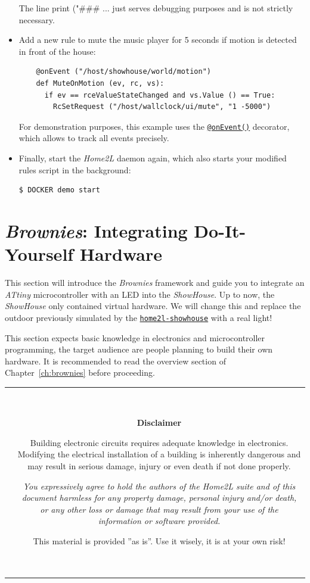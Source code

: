 \documentclass[12pt,english,parskip=half,headheight=19pt]{scrreprt}
\newcommand{\lstf}[1]{\colorbox{lstbackground}{\ttfamily\footnotesize#1}}
\newcommand{\warnbox}[1]{
  \par
  \medskip
  \hfill
  \setlength\arrayrulewidth{1pt}
  \begin{tabular}[b]{c|c|}
    
    &
    \,\parbox{0.89\linewidth}{\setlength{\parskip}{0.5em}#1}\,
  \end{tabular}
  \medskip
  \par
}
\newcommand{\eshockdisclaimer}{
  \warnbox{\textbf{Disclaimer}

    Building electronic circuits requires adequate knowledge in electronics.
    Modifying the electrical installation of a building is inherently dangerous and may result in
    serious damage, injury or even death if not done properly.

    \textit{You expressively agree to hold the authors of the \textit{Home2L} suite and of this
    document harmless for any property damage, personal injury and/or death, or any other loss or
    damage that may result from your use of the information or software provided.}

    This material is provided ''as is''. Use it wisely, it is at your own risk!
  }
}
\newcommand{\idx}[1]{#1\index{#1}}
\newcommand{\reftool}[1]{\hyperref[tool:#1]{\texttt{\idx{#1}}}}
\newcommand{\refapipython}[1]{\href{home2l-api_python/index.html}{\mbox{\texttt{#1}}}}  %
\begin{document}
\begin{itemize}[$\blacktriangleright$]
  The line \lstf{print ("\#\#\# ...} just serves debugging purposes and is not strictly necessary.

\item
  Add a new rule to mute the music player for 5 seconds if motion is detected in
  front of the house:
  \begin{lstlisting}
    @onEvent ("/host/showhouse/world/motion")
    def MuteOnMotion (ev, rc, vs):
      if ev == rceValueStateChanged and vs.Value () == True:
        RcSetRequest ("/host/wallclock/ui/mute", "1 -5000")
  \end{lstlisting}

  For demonstration purposes, this example uses the \refapipython{@onEvent()} decorator,
  which allows to track all events precisely.

\item
  Finally, start the \textit{Home2L} daemon again, which also starts your modified rules script
  in the background:
  \begin{lstlisting}[language=bash]
    $ DOCKER demo start
  \end{lstlisting}

\end{itemize}





\clearpage
\section{\textit{Brownies}: Integrating Do-It-Yourself Hardware}
\label{sec:tutorial-brownies}


This section will introduce the \textit{Brownies} framework and guide you to integrate an \textit{ATtiny} microcontroller with an LED into the \textit{ShowHouse}. Up to now, the \textit{ShowHouse} only contained virtual hardware. We will change this and replace the outdoor previously simulated by the \reftool{home2l-showhouse} with a real light!

This section expects basic knowledge in electronics and microcontroller programming, the target audience are people planning  to build their own hardware. It is recommended to read the overview section of Chapter~\ref{ch:brownies} before proceeding.

\eshockdisclaimer
\end{document}
